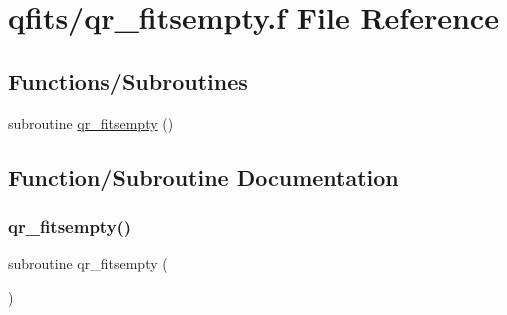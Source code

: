 \hypertarget{qr__fitsempty_8f}{}\section{qfits/qr\+\_\+fitsempty.f File Reference}
\label{qr__fitsempty_8f}
\subsection*{Functions/\+Subroutines}
\begin{DoxyCompactItemize}
\item 
subroutine \hyperlink{qr__fitsempty_8f_a4b0901fa7f6c31735a1cf276b6c75264}{qr\+\_\+fitsempty} ()
\end{DoxyCompactItemize}


\subsection{Function/\+Subroutine Documentation}
\mbox{\label{qr__fitsempty_8f_a4b0901fa7f6c31735a1cf276b6c75264}} 
\subsubsection{\texorpdfstring{qr\+\_\+fitsempty()}{qr\_fitsempty()}}
{\footnotesize\ttfamily subroutine qr\+\_\+fitsempty (\begin{DoxyParamCaption}{ }\end{DoxyParamCaption})}

